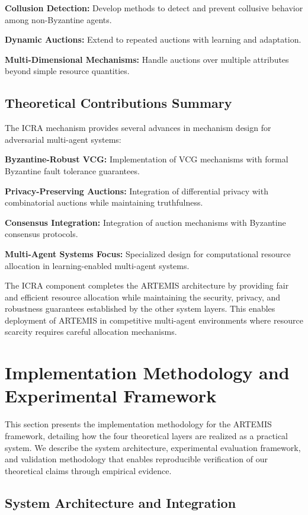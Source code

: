 \documentclass[conference]{IEEEtran}
\begin{document}
\textbf{Collusion Detection:} Develop methods to detect and prevent collusive behavior among non-Byzantine agents.

\textbf{Dynamic Auctions:} Extend to repeated auctions with learning and adaptation.

\textbf{Multi-Dimensional Mechanisms:} Handle auctions over multiple attributes beyond simple resource quantities.

\subsection{Theoretical Contributions Summary}

The ICRA mechanism provides several advances in mechanism design for adversarial multi-agent systems:

\textbf{Byzantine-Robust VCG:} Implementation of VCG mechanisms with formal Byzantine fault tolerance guarantees.

\textbf{Privacy-Preserving Auctions:} Integration of differential privacy with combinatorial auctions while maintaining truthfulness.

\textbf{Consensus Integration:} Integration of auction mechanisms with Byzantine consensus protocols.

\textbf{Multi-Agent Systems Focus:} Specialized design for computational resource allocation in learning-enabled multi-agent systems.

The ICRA component completes the ARTEMIS architecture by providing fair and efficient resource allocation while maintaining the security, privacy, and robustness guarantees established by the other system layers. This enables deployment of ARTEMIS in competitive multi-agent environments where resource scarcity requires careful allocation mechanisms.

\section{Implementation Methodology and Experimental Framework}

This section presents the implementation methodology for the ARTEMIS framework, detailing how the four theoretical layers are realized as a practical system. We describe the system architecture, experimental evaluation framework, and validation methodology that enables reproducible verification of our theoretical claims through empirical evidence.

\subsection{System Architecture and Integration}
\end{document}
